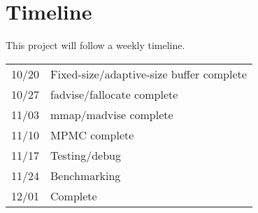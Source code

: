 \documentclass[12pt]{article}
\begin{document}
\section{Timeline}
This project will follow a weekly timeline. \\
\begin{tabular}{|l | l|}
\hline
10/20 & Fixed-size/adaptive-size buffer complete \\
10/27 & fadvise/fallocate complete \\
11/03 & mmap/madvise complete \\
11/10 & MPMC complete \\
11/17 & Testing/debug \\
11/24 & Benchmarking \\
12/01 & Complete \\
\hline
\end{tabular}
\end{document}

